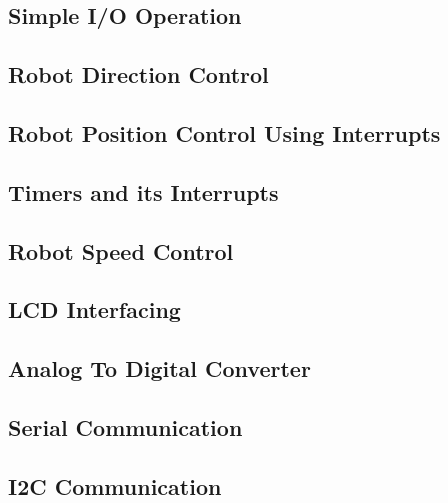 \documentclass[a4paper,10pt,oneside]{article}
\begin{document}
		\subsection{\huge \textbf{Simple I/O Operation}}
		\subsection{\huge \textbf{Robot Direction Control}}
		\subsection{\huge \textbf{Robot Position Control Using Interrupts}}
		\subsection{\huge \textbf{Timers and its Interrupts}}
		\subsection{\huge \textbf{Robot Speed Control}}
		\subsection{\huge \textbf{LCD Interfacing}}
		\subsection{\huge \textbf{Analog To Digital Converter}}
		\subsection{\huge \textbf{Serial Communication}}
		\subsection{\huge \textbf{I2C Communication}}
\end{document}
